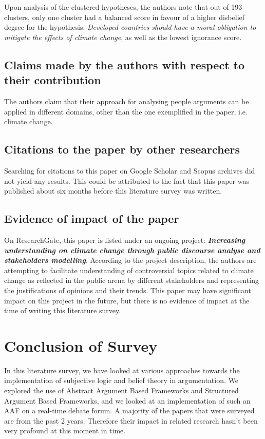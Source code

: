 \documentclass[UTF8]{article}
\begin{document}
Upon analysis of the clustered hypotheses, the authors note that out of 193 clusters, only one cluster had a balanced score in favour of a higher disbelief degree for the hypothesis:
 \textit{Developed countries should have a moral obligation to mitigate the effects of climate change}, as well as the lowest ignorance score.
\subsection{Claims made by the authors with respect to their contribution}
The authors claim that their approach for analysing people arguments can be applied in different domains, other than the one exemplified in the paper, i.e. climate change.

\subsection{Citations to the paper by other researchers}
Searching for citations to this paper on Google Scholar and Scopus archives did not yield any results. This could be attributed to the fact that this paper was published about six months before this literature survey was written.

\subsection{Evidence of impact of the paper}
On ResearchGate, this paper is listed under an ongoing project: \textbf{\textit{Increasing understanding on climate change through public discourse analyse and stakeholders modelling}}. According to the project description, the authors are attempting to facilitate understanding of controversial topics related to climate change as reflected in the public arena by different stakeholders and representing the justifications of opinions and their trends. This paper may have significant impact on this project in the future, but there is no evidence of impact at the time of writing this literature survey.

\section{Conclusion of Survey}
In this literature survey, we have looked at various approaches towards the implementation of subjective logic and belief theory in argumentation. We explored the use of Abstract Argument Based Frameworks and Structured Argument Based Frameworks, and we looked at an implementation of such an AAF on a real-time debate forum. A majority of the papers that were surveyed are from the past 2 years. 
Therefore their impact in related research hasn't been very profound at this moment in time.
{}

\end{document}
